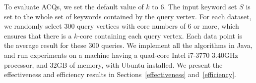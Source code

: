 To evaluate ACQs, we set the default value of $k$ to 6. The input keyword set $S$ is set to the whole set of keywords contained by the query vertex. For each dataset, we randomly select 300 query vertices with core numbers of 6 or more, which ensures that there is a $k$-core containing each query vertex.
Each data point is the average result for these 300 queries.
We implement all the algorithms in Java, and run experiments on a machine having a quad-core Intel i7-3770 3.40GHz processor, and 32GB of memory, with Ubuntu installed.
We present the effectiveness and efficiency results in Sections~\ref{effectiveness} and~\ref{efficiency}. 
